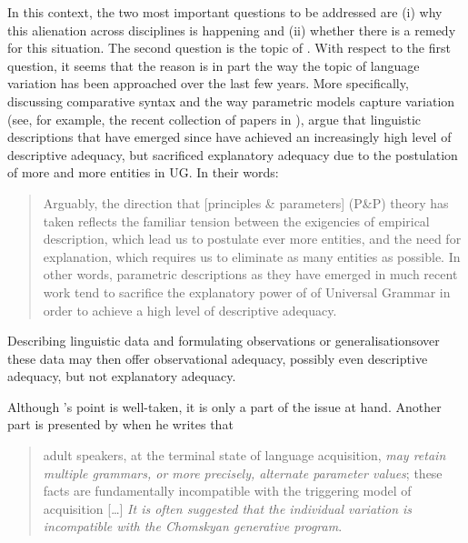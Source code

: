 \documentclass[output=paper]{langsci/langscibook}
\begin{document}
In this context, the two most important questions to be addressed are (i) why
this alienation across disciplines is happening and (ii) whether there is a
remedy for this situation. The second question is the topic of . With
respect to the first question, it seems that the reason is in part the way the
topic of language variation has been approached over the last few years. More
specifically, discussing comparative syntax and the way parametric models
capture variation (see, for example, the recent collection of papers in
\citealt{FábregasEtAl2015}), \citet{BibHolRobShee2014} argue that linguistic
descriptions that have emerged since \citet{Chomsky:81} have achieved an
increasingly high level of descriptive adequacy, but sacrificed explanatory
adequacy due to the postulation of more and more entities in \gls{UG}. In their
words:

\begin{quote}

Arguably, the direction that [principles \& parameters] (P\&P) theory has taken
reflects the familiar tension between the exigencies of empirical description,
which lead us to postulate ever more entities, and the need for explanation,
which requires us to eliminate as many entities as possible. In other words,
parametric descriptions as they have emerged in much recent work tend to
sacrifice the explanatory power of  of Universal Grammar in order to
achieve a high level of descriptive adequacy.
\parencite[104]{BibHolRobShee2014}

\end{quote}

Describing linguistic data and formulating observations or generalisations\linebreak over
these data may then offer observational adequacy, possibly even descriptive
adequacy, but not explanatory adequacy.

Although \citeauthor{BibHolRobShee2014}'s point is well-taken, it is only a
part of the issue at hand. Another part is presented by \citet{Yang2004} when
he writes that

\begin{quote}

adult speakers, at the terminal state of language acquisition, \emph{may retain
    multiple grammars, or more precisely, alternate parameter values}; these
    facts are fundamentally incompatible with the triggering model of
    acquisition [\dots{}] \emph{It is often suggested that the individual
    variation is incompatible with the Chomskyan generative program}.
    \parencite[50--51]{Yang2004}

\end{quote}
\end{document}
